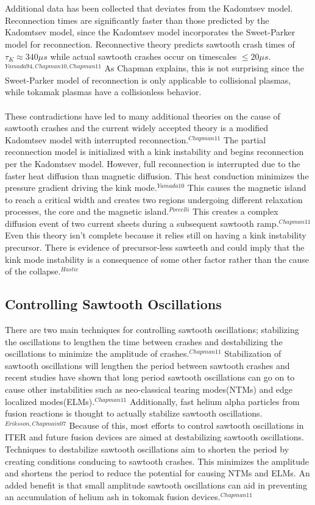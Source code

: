 \documentclass{article}
\begin{document}
\\\\Additional data has been collected that deviates from the Kadomtsev model.  Reconnection times are significantly faster than those predicted by the Kadomtsev model, since the Kadomtsev model incorporates the Sweet-Parker model for reconnection.  Reconnective theory predicts sawtooth crash times of $\tau_K \approx340 \mu s$ while actual sawtooth crashes occur on timescales $\leq20\mu s$.$^{Yamada94,Chapman10,Chapman11}$  As Chapman explains, this is not surprising since the Sweet-Parker model of reconnection is only applicable to collisional plasmas, while tokamak plasmas have a collisionless behavior.\\\\
These contradictions have led to many additional theories on the cause of sawtooth crashes and the current widely accepted theory is a modified Kadomtsev model with interrupted reconnection.$^{Chapman11}$  The partial reconnection model is initialized with a kink instability and begins reconnection per the Kadomtsev model.  However, full reconnection is interrupted due to the faster heat diffusion than magnetic diffusion.  This heat conduction minimizes the pressure gradient driving the kink mode.$^{Yamada10}$  This causes the magnetic island to reach a critical width and creates two regions undergoing different relaxation processes, the core and the magnetic island.$^{Porcelli}$  This creates a complex diffusion event of two current sheets during a subsequent sawtooth ramp.$^{Chapman11}$  Even this theory isn't complete because it relies still on having a kink instability precursor.  There is evidence of precursor-less sawteeth and could imply that the kink mode instability is a consequence of some other factor rather than the cause of the collapse.$^{Hastie}$
\subsection{Controlling Sawtooth Oscillations}
There are two main techniques for controlling sawtooth oscillations; stabilizing the oscillations to lengthen the time between crashes and destabilizing the oscillations to minimize the amplitude of crashes.$^{Chapman11}$  Stabilization of sawtooth oscillations will lengthen the period between sawtooth crashes and recent studies have shown that long period sawtooth oscillations can go on to cause other instabilities such as neo-classical tearing modes(NTMs) and edge localized modes(ELMs).$^{Chapman11}$  Additionally, fast helium alpha particles from fusion reactions is thought to actually stabilize sawtooth oscillations.$^{Eriksson,Chapmain07}$  Because of this, most efforts to control sawtooth oscillations in ITER and future fusion devices are aimed at destabilizing sawtooth oscillations.  Techniques to destabilize sawtooth oscillations aim to shorten the period by creating conditions conducing to sawtooth crashes.  This minimizes the amplitude and shortens the period to reduce the potential for causing NTMs and ELMs.  An added benefit is that small amplitude sawtooth oscillations can aid in preventing an accumulation of helium ash in tokomak fusion devices.$^{Chapman11}$
\end{document}
